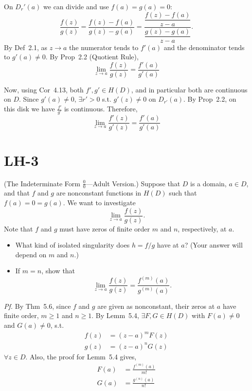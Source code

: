 \documentclass[a4paper]{article}
\begin{document}
On $D_r'(a)$ we can divide and use $f(a) = g(a) = 0$:
\[
\frac{f(z)}{g(z)}
= \frac{f(z) - f(a)}{g(z) - g(a)}
= \frac{\dfrac{f(z) - f(a)}{z - a}}{\dfrac{g(z) - g(a)}{z - a}}.
\]
By Def~2.1, as $z \to a$ the numerator tends to $f'(a)$ and the denominator tends to $g'(a) \neq 0$. By Prop~2.2 (Quotient Rule),
\[
\lim_{z \to a} \frac{f(z)}{g(z)} = \frac{f'(a)}{g'(a)}
\]

\medskip
Now, using Cor~4.13, both $f', g' \in H(D)$, and in particular both are continuous on $D$. Since $g'(a) \neq 0$, $\exists r' > 0$ s.t. $g'(z) \neq 0$ on $D_{r'}(a)$. By Prop~2.2, on this disk we have $\displaystyle \frac{f'}{g'}$ is continuous. Therefore,
\[
\lim_{z \to a} \frac{f'(z)}{g'(z)} = \frac{f'(a)}{g'(a)}
\]

\newpage
\section*{LH-3}

\begin{tcolorbox}[colback=gray!10, colframe=black, boxrule=0.5pt, arc=2mm]
(The Indeterminate Form $\frac{0}{0}$---Adult Version.) Suppose that $D$ is a domain, $a \in D$, and that $f$ and $g$ are nonconstant functions in $H(D)$ such that $f(a) = 0 = g(a)$. We want to investigate
\[
\lim_{z \to a} \frac{f(z)}{g(z)}.
\]
Note that $f$ and $g$ must have zeros of finite order $m$ and $n$, respectively, at $a$.

\begin{itemize}
\item[\textbf{(a)}] What kind of isolated singularity does $h = f/g$ have at $a$? (Your answer will depend on $m$ and $n$.)
\item[\textbf{(b)}] If $m = n$, show that
\[
\lim_{z \to a} \frac{f(z)}{g(z)} = \frac{f^{(m)}(a)}{g^{(m)}(a)}.
\]
\end{itemize}
\end{tcolorbox}

\textit{Pf.} By Thm~5.6, since $f$ and $g$ are given as nonconstant, their zeros at $a$ have finite order, $m \geq 1$ and $n \geq 1$. By Lemm~5.4, $\exists F, G \in H(D)$ with $F(a) \neq 0$ and $G(a) \neq 0$, s.t.
\begin{align*}
f(z) &= (z - a)^m F(z)\\
g(z) &= (z - a)^n G(z)
\end{align*}
$\forall z \in D$. Also, the proof for Lemm~5.4 gives,
\begin{align*}
F(a) &= \frac{f^{(m)}(a)}{m!}\\
G(a) &= \frac{g^{(n)}(a)}{n!}
\end{align*}
\end{document}
